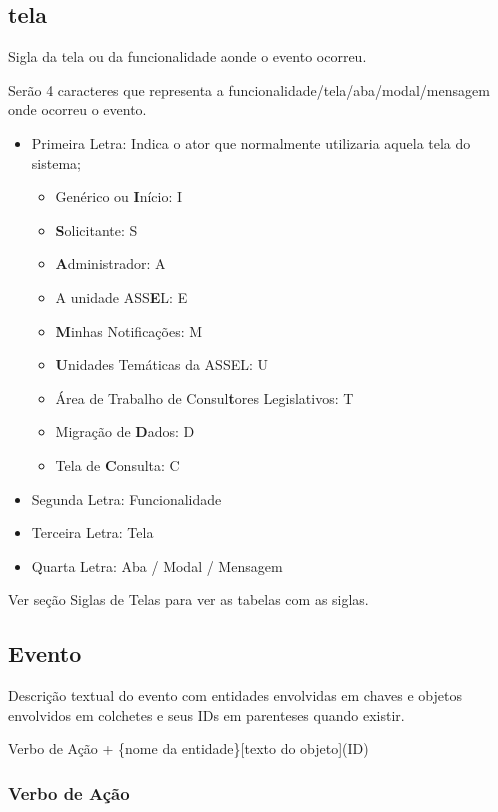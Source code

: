 \subsection{tela}

Sigla da tela ou da funcionalidade aonde o evento ocorreu.

Serão 4 caracteres que representa a funcionalidade/tela/aba/modal/mensagem onde ocorreu o evento. 

\begin{itemize}
	\item Primeira Letra: Indica o ator que normalmente utilizaria aquela tela do sistema;
	\begin{itemize}
		\item Genérico ou \textbf{I}nício: I
		\item \textbf{S}olicitante: S
		\item \textbf{A}dministrador: A		
		\item A unidade ASS\textbf{E}L: E
		\item \textbf{M}inhas Notificações: M 
		\item \textbf{U}nidades Temáticas da ASSEL: U
		\item Área de Trabalho de Consul\textbf{t}ores Legislativos: T
		\item Migração de \textbf{D}ados: D
		\item Tela de \textbf{C}onsulta: C		
	\end{itemize}
	\item Segunda Letra: Funcionalidade
	\item Terceira Letra: Tela
	\item Quarta Letra: Aba / Modal / Mensagem
\end{itemize}

Ver seção Siglas de Telas para ver as tabelas com as siglas.

\subsection{Evento}
\label{sec-evento}

Descrição textual do evento com entidades envolvidas em chaves e objetos envolvidos em colchetes e seus IDs em parenteses quando existir. 

\begin{center}
 \Large
	Verbo de Ação + \{nome da entidade\}[texto do objeto](ID)
\end{center}

\subsubsection{Verbo de Ação}

